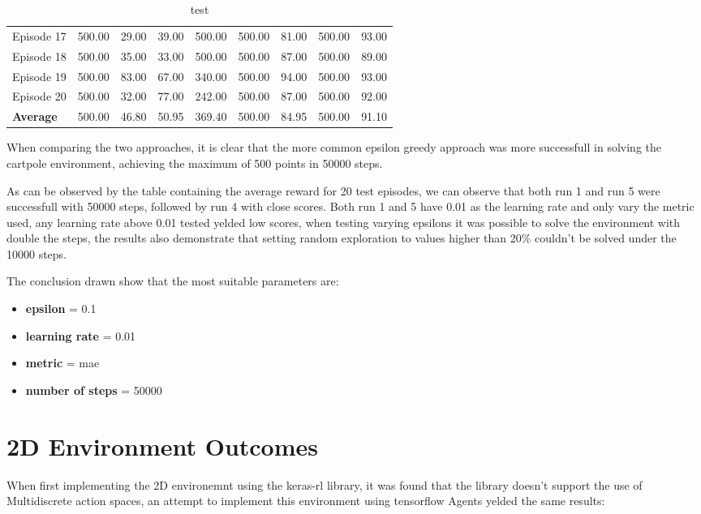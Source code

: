 \begin{table}[H]
\begin{tabular}{l|l|l|l|l|l|l|l|l|}
        \multicolumn{1}{|l|}{Episode 17} & 500.00 & 29.00 & 39.00 & 500.00 & 500.00 & 81.00& 500.00 & 93.00\\
        \multicolumn{1}{|l|}{Episode 18} & 500.00 & 35.00 & 33.00 & 500.00 & 500.00 & 87.00& 500.00 & 89.00\\
        \multicolumn{1}{|l|}{Episode 19} & 500.00 & 83.00 & 67.00 & 340.00 & 500.00 & 94.00& 500.00 & 93.00\\
        \multicolumn{1}{|l|}{Episode 20} & 500.00 & 32.00 & 77.00 & 242.00 & 500.00 & 87.00& 500.00 & 92.00\\ \hline
        \multicolumn{1}{|l|}{\textbf{Average}} & 500.00 & 46.80 & 50.95 & 369.40 & 500.00 & 84.95 & 500.00 &91.10 \\
        \hline
    \end{tabular}
    \caption{test} %
    \end{table}

    When comparing the two approaches, it is clear that the more common epsilon greedy approach was more successfull in solving the cartpole environment, achieving the maximum of 500 points in 50000 steps.

    As can be observed by the table containing the average reward for 20 test episodes, we can observe that both run 1 and run 5 were successfull with 50000 steps, followed by run 4 with close scores.
    Both run 1 and 5 have 0.01 as the learning rate and only vary the metric used, any learning rate above 0.01 tested yelded low scores, when testing varying epsilons it was possible to solve the environment with double the steps, 
    the results also demonstrate that setting random exploration to values higher than 20\% couldn't be solved under the 10000 steps.

    The conclusion drawn show that the most suitable parameters are:
    \begin{itemize}
        \item \textbf{epsilon} = 0.1
        \item \textbf{learning rate} = 0.01
        \item \textbf{metric} = mae
        \item \textbf{number of steps} = 50000
    \end{itemize}
        
   \section{2D Environment Outcomes}
When first implementing the 2D environemnt using the keras-rl library, it was found that the library doesn't support the use of Multidiscrete action spaces, 
an attempt to implement this environment using tensorflow Agents yelded the same results:


